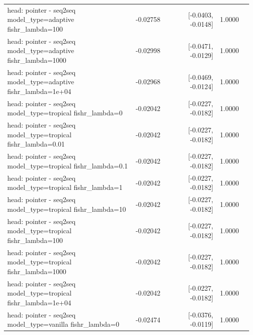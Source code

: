 \documentclass[10pt]{article}
\makeatletter
\newcommand{\stackcell}[1]{\begin{tabular}[t]{@{}l@{}}#1\end{tabular}}
\makeatother
\begin{document}
{\begin{longtable}{lrrrl}
\stackcell{head: pointer - seq2seq\\\footnotesize model\_type=adaptive fishr\_lambda=100 } & -0.02758 & [-0.0403, -0.0148] & 1.0000 & \\
\stackcell{head: pointer - seq2seq\\\footnotesize model\_type=adaptive fishr\_lambda=1000 } & -0.02998 & [-0.0471, -0.0129] & 1.0000 & \\
\stackcell{head: pointer - seq2seq\\\footnotesize model\_type=adaptive fishr\_lambda=1e+04 } & -0.02968 & [-0.0469, -0.0124] & 1.0000 & \\
\stackcell{head: pointer - seq2seq\\\footnotesize model\_type=tropical fishr\_lambda=0 } & -0.02042 & [-0.0227, -0.0182] & 1.0000 & \\
\stackcell{head: pointer - seq2seq\\\footnotesize model\_type=tropical fishr\_lambda=0.01 } & -0.02042 & [-0.0227, -0.0182] & 1.0000 & \\
\stackcell{head: pointer - seq2seq\\\footnotesize model\_type=tropical fishr\_lambda=0.1 } & -0.02042 & [-0.0227, -0.0182] & 1.0000 & \\
\stackcell{head: pointer - seq2seq\\\footnotesize model\_type=tropical fishr\_lambda=1 } & -0.02042 & [-0.0227, -0.0182] & 1.0000 & \\
\stackcell{head: pointer - seq2seq\\\footnotesize model\_type=tropical fishr\_lambda=10 } & -0.02042 & [-0.0227, -0.0182] & 1.0000 & \\
\stackcell{head: pointer - seq2seq\\\footnotesize model\_type=tropical fishr\_lambda=100 } & -0.02042 & [-0.0227, -0.0182] & 1.0000 & \\
\stackcell{head: pointer - seq2seq\\\footnotesize model\_type=tropical fishr\_lambda=1000 } & -0.02042 & [-0.0227, -0.0182] & 1.0000 & \\
\stackcell{head: pointer - seq2seq\\\footnotesize model\_type=tropical fishr\_lambda=1e+04 } & -0.02042 & [-0.0227, -0.0182] & 1.0000 & \\
\stackcell{head: pointer - seq2seq\\\footnotesize model\_type=vanilla fishr\_lambda=0 } & -0.02474 & [-0.0376, -0.0119] & 1.0000 & \\

\end{longtable}}
\end{document}
